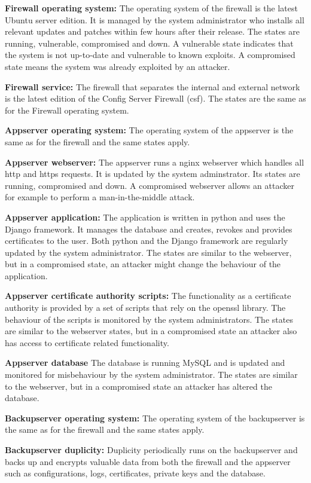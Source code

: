\documentclass[english]{article}
\begin{document}
	\begin{description}
		\item{\textbf{Firewall operating system:}} The operating system of the firewall is the latest Ubuntu server edition. It is managed by the system administrator who installs all relevant updates and patches within few hours after their release. The states are running, vulnerable, compromised and down. A vulnerable state indicates that the system is not up-to-date and vulnerable to known exploits. A compromised state means the system was already exploited by an attacker.
		\item{\textbf{Firewall service:}} The firewall that separates the internal and external network is the latest edition of the Config Server Firewall (csf). The states are the same as for the Firewall operating system.
		\item{\textbf{Appserver operating system:}} The operating system of the appserver is the same as for the firewall and the same states apply.
		\item{\textbf{Appserver webserver:}} The appserver runs a nginx webserver which handles all http and https requests. It is updated by the system adminstrator. Its states are running, compromised and down. A compromised webserver allows an attacker for example to perform a man-in-the-middle attack.
		\item{\textbf{Appserver application:}} The application is written in python and uses the Django framework. It manages the database and creates, revokes and provides certificates to the user. Both python and the Django framework are regularly updated by the system administrator. The states are similar to the webserver, but in a compromised state, an attacker might change the behaviour of the application.
		\item{\textbf{Appserver certificate authority scripts:}} The functionality as a certificate authority is provided by a set of scripts that rely on the openssl library. The behaviour of the scripts is monitored by the system administrators. The states are similar to the webserver states, but in a compromised state an attacker also has access to certificate related functionality.
		\item{\textbf{Appserver database}} The database is running MySQL and is updated and monitored for misbehaviour by the system administrator. The states are similar to the webserver, but in a compromised state an attacker has altered the database.
		\item{\textbf{Backupserver operating system:}} The operating system of the backupserver is the same as for the firewall and the same states apply.
		\item{\textbf{Backupserver duplicity:}} Duplicity periodically runs on the backupserver and backs up and encrypts valuable data from both the firewall and the appserver such as configurations, logs, certificates, private keys and the database.
	\end{description}
\end{document}
